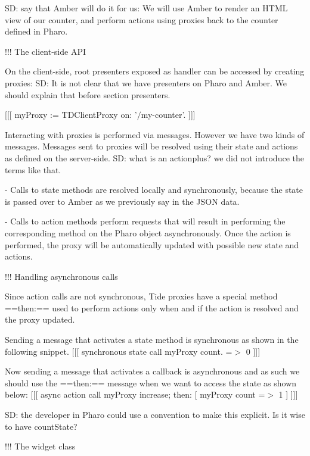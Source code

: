\documentclass[a4paper,10pt,twoside]{book}
\begin{document}
\begin{todo}
{SD: say that Amber will do it for us: 
We will use Amber to render an HTML view of our counter, and perform actions using proxies
back to the counter defined in Pharo.

!!! The client-side API

On the client-side, root presenters exposed as handler can be accessed by creating proxies:
SD: It is not clear that we have presenters on Pharo and Amber. We should explain that before section presenters.

{[}{[}{[}
myProxy := TDClientProxy on: '$/$my-counter'.
{]}{]}{]}

Interacting with proxies is performed via messages. However we have two kinds of messages. Messages sent to proxies will be resolved using their state and actions as defined on the server-side. SD: what is an actionplus? we did not introduce the terms like that.

- Calls to state methods are resolved locally and synchronously, because the state is passed over to Amber as we previously say in the JSON data.

- Calls to action methods perform requests that will result in performing the corresponding
method on the Pharo object asynchronously. Once the action is performed, the proxy will
be automatically updated with possible new state and actions.



!!! Handling asynchronous calls

Since action calls are not synchronous, Tide proxies have a special method ==then:== used
to perform actions only when and if the action is resolved and the proxy updated.


Sending a message that activates a state method is synchronous as shown in the following snippet.
{[}{[}{[}
synchronous state call
myProxy count. =$>$ 0
{]}{]}{]}

Now sending a message that activates a callback is asynchronous and as such we should use the ==then:== message when we want to access the state as shown below: 
{[}{[}{[}
async action call
myProxy increase; then: {[}
    myProxy count =$>$ 1 {]}
{]}{]}{]}

SD: the developer in Pharo could use a convention to make this explicit. Is it wise to have countState?

!!! The widget class

}
\end{todo}
\end{document}
